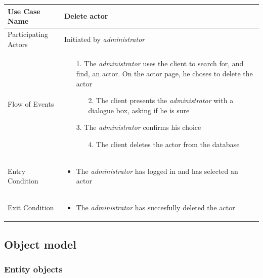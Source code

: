 \begin{center}
	\begin{tabular}{ | l | p{10cm} |  }
		 \hline
		Use Case Name & Delete actor \\ \hline
		Participating Actors & Initiated by \emph{administrator} \\ \hline
		Flow of Events & \begin{enumerate}
						\item[1.] The \emph{administrator} uses the client to search for, and find, an actor. On the actor page, he choses to delete the actor
						\begin{enumerate}
							\item[2.] The client presents the \emph{administrator} with a dialogue box, asking if he is sure
						\end{enumerate}
						\item[3.] The \emph{administrator} confirms his choice
						\begin{enumerate}
							\item[4.] The client deletes the actor from the database
						\end{enumerate}
					\end{enumerate} \\ \hline
		Entry Condition & \begin{itemize}
						\item The \emph{administrator} has logged in and has selected an actor
					\end{itemize} \\ \hline
		Exit Condition & \begin{itemize}
						\item The \emph{administrator} has succesfully deleted the actor
					\end{itemize} \\
		\hline
	\end{tabular}
\end{center}


\subsection{Object model}

\subsubsection{Entity objects}

